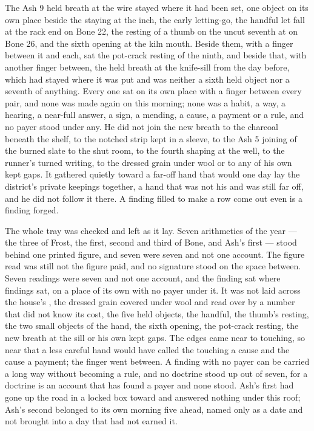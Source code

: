 The Ash 9 held breath at the wire stayed where it had been set, one object on its own place beside the staying at the inch, the early letting-go, the handful let fall at the rack end on Bone 22, the resting of a thumb on the uncut seventh at  on Bone 26, and the sixth opening at the kiln mouth. Beside them, with a finger between it and each, sat the pot-crack resting of the ninth, and beside that, with another finger between, the held breath at the knife-sill from the day before, which had stayed where it was put and was neither a sixth held object nor a seventh of anything. Every one sat on its own place with a finger between every pair, and none was made again on this morning; none was a habit, a way, a hearing, a near-full answer, a sign, a mending, a cause, a payment or a rule, and no payer stood under any. He did not join the new breath to the charcoal beneath the shelf, to the notched strip kept in a sleeve, to the Ash 5 joining of the burned slate to the shut room, to the fourth shaping at the well, to the runner's turned writing, to the dressed grain under wool or to any of his own kept gaps. It gathered quietly toward a far-off hand that would one day lay the district's private keepings together, a hand that was not his and was still far off, and he did not follow it there. A finding filled to make a row come out even is a finding forged.

\scenebreak

The whole tray was checked and left as it lay. Seven arithmetics of the year --- the three of Frost, the first, second and third of Bone, and Ash's first --- stood behind one printed figure, and seven were seven and not one account. The figure read was still not the figure paid, and no signature stood on the space between. Seven readings were seven and not one account, and the finding sat where findings sat, on a place of its own with no payer under it. It was not laid across the house's , the dressed grain covered under wool and read over by a number that did not know its cost, the five held objects, the handful, the thumb's resting, the two small objects of the hand, the sixth opening, the pot-crack resting, the new breath at the sill or his own kept gaps. The edges came near to touching, so near that a less careful hand would have called the touching a cause and the cause a payment; the finger went between. A finding with no payer can be carried a long way without becoming a rule, and no doctrine stood up out of seven, for a doctrine is an account that has found a payer and none stood. Ash's first had gone up the road in a locked box toward  and answered nothing under this roof; Ash's second belonged to its own morning five ahead, named only as a date and not brought into a day that had not earned it.


